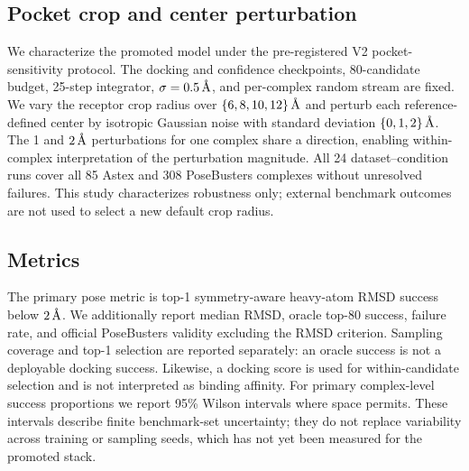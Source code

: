 \subsection{Pocket crop and center perturbation}

We characterize the promoted model under the pre-registered V2
pocket-sensitivity protocol. The docking and
confidence checkpoints, 80-candidate budget, 25-step integrator,
\(\sigma=0.5\,\text{\normalfont\AA}\), and per-complex random stream are fixed. We vary
the receptor crop radius over \(\{6,8,10,12\}\,\text{\normalfont\AA}\) and perturb each
reference-defined center by isotropic Gaussian noise with standard deviation
\(\{0,1,2\}\,\text{\normalfont\AA}\). The 1 and \(2\,\text{\normalfont\AA}\) perturbations for one
complex share a direction, enabling within-complex interpretation of the
perturbation magnitude. All 24 dataset--condition runs cover all 85 Astex and
308 PoseBusters complexes without unresolved failures. This study
characterizes robustness only; external benchmark outcomes are not used to
select a new default crop radius.

\subsection{Metrics}

The primary pose metric is top-1 symmetry-aware heavy-atom RMSD success below
\(2\,\text{\normalfont\AA}\). We additionally report median RMSD, oracle top-80 success,
failure rate, and official PoseBusters validity excluding the RMSD criterion.
Sampling coverage and top-1 selection are reported separately: an oracle
success is not a deployable docking success. Likewise, a docking score is used
for within-candidate selection and is not interpreted as binding affinity.
For primary complex-level success proportions we report 95\% Wilson intervals
where space permits. These intervals describe finite benchmark-set
uncertainty; they do not replace variability across training or sampling
seeds, which has not yet been measured for the promoted stack.
